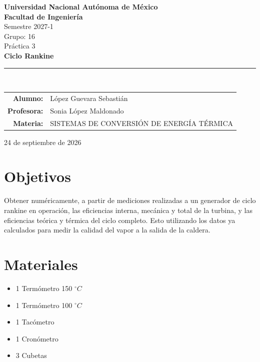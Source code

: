 \documentclass[12pt,letterpaper]{article}
\newcommand{\institucion}{Universidad Nacional Autónoma de México}
\newcommand{\facultad}{Facultad de Ingeniería}
\newcommand{\numpractica}{Práctica 3}
\newcommand{\semestre}{Semestre 2027-1}
\newcommand{\entrega}{24 de septiembre de 2026}
\newcommand{\grupo}{Grupo: 16}
\newcommand{\alumno}{López Guevara Sebastián}
\newcommand{\profesora}{Sonia López Maldonado}
\newcommand{\practica}{Ciclo Rankine}
\newcommand{\materia}{SISTEMAS DE CONVERSIÓN DE ENERGÍA TÉRMICA}
\begin{document}
\thispagestyle{empty}

\begin{center}

    {\Large\bfseries \institucion}\\[0.3cm]
    {\Large\bfseries \facultad}\\[0.3cm]
    {\large \semestre}\\[0.2cm]
    {\large \grupo}\\[1.5cm]
    
    
    {\large \numpractica}\\[0.2cm]
    {\Huge\bfseries \practica}\\[0.5cm]
    \rule{0.8\textwidth}{0.4pt}\\[1.5cm]

    \begin{tabular}{rl}
        \textbf{Alumno:}     & \alumno     \\[0.3cm]
        \textbf{Profesora:}  & \profesora  \\[0.3cm]
        \textbf{Materia:}    & \materia    \\
    \end{tabular}

    \vfill
    
    {\entrega}
    
\end{center}

\break

\section{Objetivos}

Obtener numéricamente, a partir de mediciones realizadas a un generador
de ciclo rankine en operación, las eficiencias interna, mecánica y total de la turbina, y las
eficiencias teórica y térmica del ciclo completo. Esto utilizando los datos ya calculados 
para medir la calidad del vapor a la salida de la caldera.

\section{Materiales}

\begin{itemize}
    \item 1 Termómetro 150 $^\circ C$
    \item 1 Termómetro 100 $^\circ C$
    \item 1 Tacómetro
    \item 1 Cronómetro
    \item 3 Cubetas
\end{itemize}
\end{document}
